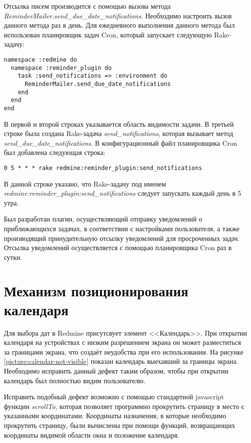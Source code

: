 Отсылка писем производится с помощью вызова метода
\textit{ReminderMailer.send\_due\_date\_notifications}. Необходимо настроить
вызов данного метода раз в день. Для ежедневного выполнения данного метода был
использован планировщик задач Cron, который запускает следующую Rake-задачу:
\small{\begin{lstlisting}
namespace :redmine do
  namespace :reminder_plugin do
    task :send_notifications => :environment do
      ReminderMailer.send_due_date_notifications
    end
  end
end
\end{lstlisting}}
В первой и второй строках указывается область видимости задачи. В третьей
строке была создана Rake-задача \textit{send\_notifications}, которая вызывает
метод \textit{send\_due\_date\_notifications}. В конфигурационный файл
планировщика Cron был добавлена следующая строка:
\small{\begin{lstlisting}
0 5 * * * rake redmine:reminder_plugin:send_notifications
\end{lstlisting}}
В данной строке указано, что Rake-задачу под именем
\textit{redmine:reminder\_plugin:send\_notifications} следует запускать каждый
день в 5 утра.

Был разработан плагин, осуществляющий отправку уведомлений о приближающихся
задачах, в соответствии с настройками пользователя, а также производящий
принудительную отсылку уведомлений для просроченных задач. Отсылка уведомлений
осуществляется с помощью планировщика Cron раз в сутки.

\section{Механизм позиционирования календаря}
Для выбора дат в Redmine присутсвует элемент <<Календарь>>. При открытии
календаря на устройствах с низким разрешением экрана он может разместиться за
границами экрана, что создаёт неудобства при его использовании. На рисунке
\ref{picture:calendar-not-visible} показан календарь выехавший за границы
экрана. Необходимо исправить данный дефект таким образом, чтобы при открытии
календарь был полностью видим пользователю.

Исправить подобный дефект возможно с помощью стандартной javascript
функции \textit{scrollTo}, которая позволяет программно прокрутить
страницу в место с указанными координатами. Координаты назначения, в которые
необходимо прокрутить страницу, были вычислены при помощи функций,
возвращающих координаты видимой области окна и положение календаря.

